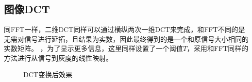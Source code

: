 \documentclass[UTF8]{ctexart}
\begin{document}
		\subsection{图像DCT}
			同FFT一样，二维DCT同样可以通过横纵两次一维DCT来完成，和FFT不同的是无需对信号进行延拓，且结果为实数，因此最终得到的是一个和原信号大小相同的实数矩阵。
			，为了显示更多信息，这里同样设置了一个阈值$T$，采用和FFT同样的方法进行从信号到灰度的线性映射。
			\begin{figure}[]
			\centering
			\caption{DCT变换后效果}
			\end{figure}
\end{document}
